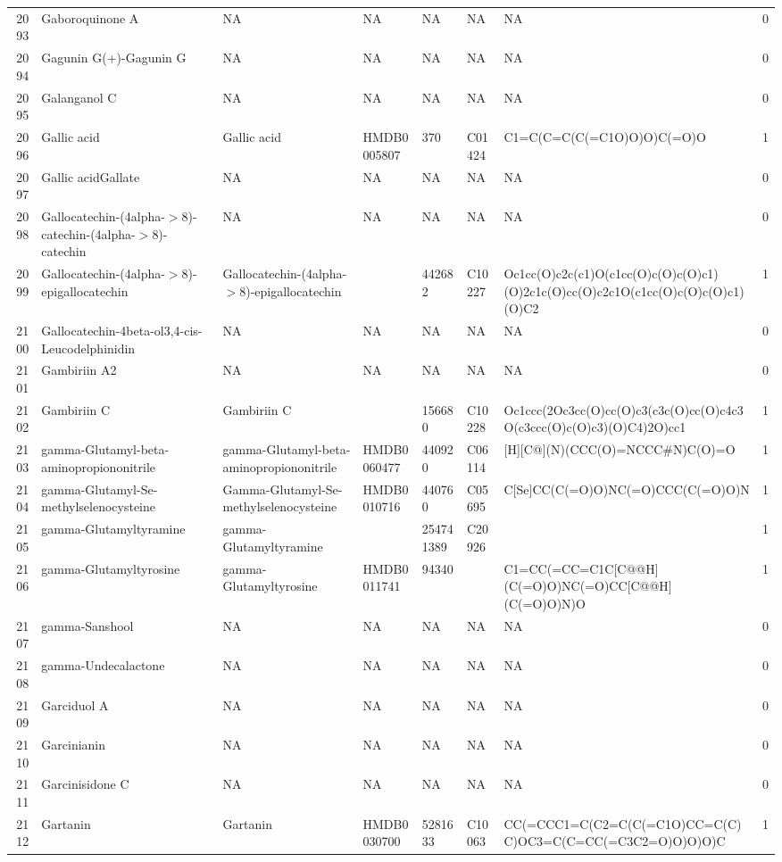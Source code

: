 \documentclass[a4paper]{article}
\begin{document}
\begin{longtable}{rlllllll}
  2093 & Gaboroquinone A & NA & NA & NA & NA & NA & 0 \\ 
  2094 & Gagunin G(+)-Gagunin G & NA & NA & NA & NA & NA & 0 \\ 
  2095 & Galanganol C & NA & NA & NA & NA & NA & 0 \\ 
  2096 & Gallic acid & Gallic acid & HMDB0005807 & 370 & C01424 & C1=C(C=C(C(=C1O)O)O)C(=O)O & 1 \\ 
  2097 & Gallic acidGallate & NA & NA & NA & NA & NA & 0 \\ 
  2098 & Gallocatechin-(4alpha-$>$8)-catechin-(4alpha-$>$8)-catechin & NA & NA & NA & NA & NA & 0 \\ 
  2099 & Gallocatechin-(4alpha-$>$8)-epigallocatechin & Gallocatechin-(4alpha-$>$8)-epigallocatechin &  & 442682 & C10227 & Oc1cc(O)c2c(c1)O(c1cc(O)c(O)c(O)c1)(O)2c1c(O)cc(O)c2c1O(c1cc(O)c(O)c(O)c1)(O)C2 & 1 \\ 
  2100 & Gallocatechin-4beta-ol3,4-cis-Leucodelphinidin & NA & NA & NA & NA & NA & 0 \\ 
  2101 & Gambiriin A2 & NA & NA & NA & NA & NA & 0 \\ 
  2102 & Gambiriin C & Gambiriin C &  & 156680 & C10228 & Oc1ccc(2Oc3cc(O)cc(O)c3(c3c(O)cc(O)c4c3O(c3ccc(O)c(O)c3)(O)C4)2O)cc1 & 1 \\ 
  2103 & gamma-Glutamyl-beta-aminopropiononitrile & gamma-Glutamyl-beta-aminopropiononitrile & HMDB0060477 & 440920 & C06114 & [H][C@](N)(CCC(O)=NCCC\#N)C(O)=O & 1 \\ 
  2104 & gamma-Glutamyl-Se-methylselenocysteine & Gamma-Glutamyl-Se-methylselenocysteine & HMDB0010716 & 440760 & C05695 & C[Se]CC(C(=O)O)NC(=O)CCC(C(=O)O)N & 1 \\ 
  2105 & gamma-Glutamyltyramine & gamma-Glutamyltyramine &  & 254741389 & C20926 &  & 1 \\ 
  2106 & gamma-Glutamyltyrosine & gamma-Glutamyltyrosine & HMDB0011741 & 94340 &  & C1=CC(=CC=C1C[C@@H](C(=O)O)NC(=O)CC[C@@H](C(=O)O)N)O & 1 \\ 
  2107 & gamma-Sanshool & NA & NA & NA & NA & NA & 0 \\ 
  2108 & gamma-Undecalactone & NA & NA & NA & NA & NA & 0 \\ 
  2109 & Garciduol A & NA & NA & NA & NA & NA & 0 \\ 
  2110 & Garcinianin & NA & NA & NA & NA & NA & 0 \\ 
  2111 & Garcinisidone C & NA & NA & NA & NA & NA & 0 \\ 
  2112 & Gartanin & Gartanin & HMDB0030700 & 5281633 & C10063 & CC(=CCC1=C(C2=C(C(=C1O)CC=C(C)C)OC3=C(C=CC(=C3C2=O)O)O)O)C & 1 \\ 

\end{longtable}
\end{document}
